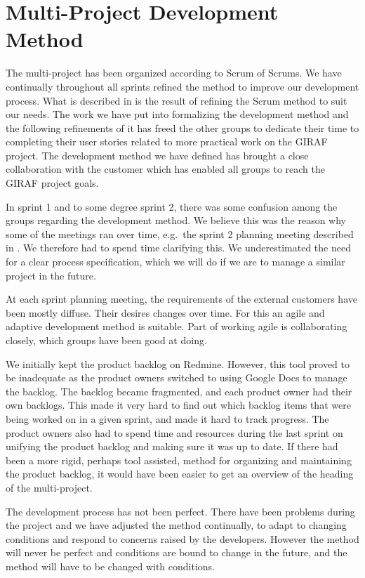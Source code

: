 \section{Multi-Project Development Method}\label{conc:multi_project_process_eval}
The multi-project has been organized according to Scrum of Scrums. We have continually throughout all sprints refined the method to improve our development process. What is described in  is the result of refining the Scrum method to suit our needs. The work we have put into formalizing the development method and the following refinements of it has freed the other groups to dedicate their time to completing their user stories related to more practical work on the GIRAF project. The development method we have defined has brought a close collaboration with the customer which has enabled all groups to reach the GIRAF project goals.

In sprint 1 and to some degree sprint 2, there was some confusion among the groups regarding the development method. We believe this was the reason why some of the meetings ran over time, e.g.\ the \db sprint 2 planning meeting described in . We therefore had to spend time clarifying this. We underestimated the need for a clear process specification, which we will do if we are to manage a similar project in the future.

At each sprint planning meeting, the requirements of the external customers have been mostly diffuse. Their desires changes over time. For this an agile and adaptive development method is suitable. Part of working agile is collaborating closely, which groups have been good at doing.

We initially kept the product backlog on Redmine. However, this tool proved to be inadequate as the product owners switched to using Google Docs to manage the backlog. The backlog became fragmented, and each product owner had their own backlogs. This made it very hard to find out which backlog items that were being worked on in a given sprint, and made it hard to track progress. The product owners also had to spend time and resources during the last sprint on unifying the product backlog and making sure it was up to date. If there had been a more rigid, perhaps tool assisted, method for organizing and maintaining the product backlog, it would have been easier to get an overview of the heading of the multi-project. 

The development process has not been perfect. There have been problems during the project and we have adjusted the method continually, to adapt to changing conditions and respond to concerns raised by the developers. However the method will never be perfect and conditions are bound to change in the future, and the method will have to be changed with conditions.

